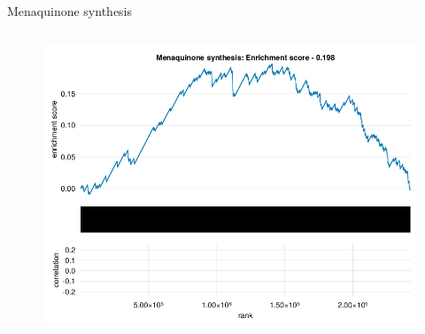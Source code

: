 \begin{frame}{Menaquinone synthesis}
    \begin{columns}[c] %

        \begin{figure}
            \includegraphics[width=1\linewidth]{../figures/fsea_Menaquinone-synthesis.png}
        \end{figure}

    \end{columns}

\end{frame}

